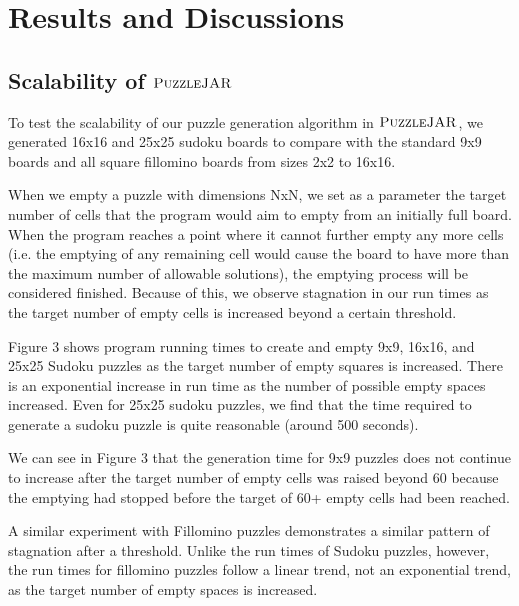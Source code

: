 \section{Results and Discussions}


\subsection{Scalability of $\textsc{PuzzleJAR}$}

To test the scalability of our puzzle generation algorithm in
$\textsc{PuzzleJAR}$, we generated 16x16 and 25x25 sudoku boards to compare
with the standard 9x9 boards and all square fillomino boards from
sizes 2x2 to 16x16.

When we empty a puzzle with dimensions NxN, we set as a parameter the
target number of cells that the program would aim to empty from an
initially full board. When the program reaches a point where it cannot
further empty any more cells (i.e. the emptying of any remaining cell
would cause the board to have more than the maximum number of
allowable solutions), the emptying process will be considered
finished. Because of this, we observe stagnation in our run times as
the target number of empty cells is increased beyond a certain
threshold.

Figure 3 shows program running times to create and empty 9x9, 16x16, and 25x25 Sudoku puzzles as the target number of empty squares is increased. There is an exponential increase in run time as the number of possible empty spaces increased. Even for 25x25 sudoku puzzles, we find that the time required to generate a sudoku puzzle is quite reasonable (around 500 seconds).

We can see in Figure 3 that the generation time for 9x9 puzzles does not continue to increase after the target number of empty cells was raised beyond 60 because the emptying had stopped before the target of 60+ empty cells had been reached. 

A similar experiment with Fillomino puzzles demonstrates a similar pattern of stagnation after a threshold. Unlike the run times of Sudoku puzzles, however, the run times for fillomino puzzles follow a linear trend, not an exponential trend, as the target number of empty spaces is increased.

